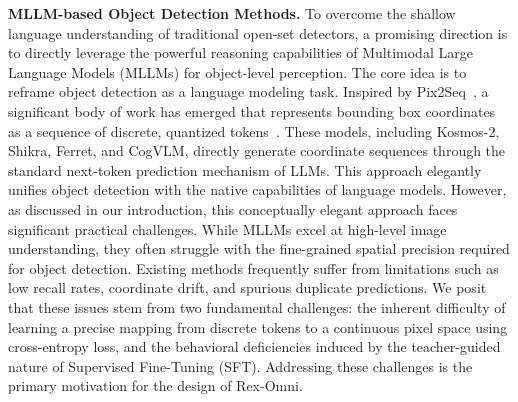 \textbf{MLLM-based Object Detection Methods.}
To overcome the shallow language understanding of traditional open-set detectors, a promising direction is to directly leverage the powerful reasoning capabilities of Multimodal Large Language Models (MLLMs) for object-level perception. The core idea is to reframe object detection as a language modeling task. Inspired by Pix2Seq~\cite{chen2021pix2seq}, a significant body of work has emerged that represents bounding box coordinates as a sequence of discrete, quantized tokens~\cite{peng2023kosmos, chen2023shikra, you2023ferret, wang2023cogvlm, zhan2025griffon}. These models, including Kosmos-2, Shikra, Ferret, and CogVLM, directly generate coordinate sequences through the standard next-token prediction mechanism of LLMs. This approach elegantly unifies object detection with the native capabilities of language models. However, as discussed in our introduction, this conceptually elegant approach faces significant practical challenges. While MLLMs excel at high-level image understanding, they often struggle with the fine-grained spatial precision required for object detection. Existing methods frequently suffer from limitations such as low recall rates, coordinate drift, and spurious duplicate predictions. We posit that these issues stem from two fundamental challenges: the inherent difficulty of learning a precise mapping from discrete tokens to a continuous pixel space using cross-entropy loss, and the behavioral deficiencies induced by the teacher-guided nature of Supervised Fine-Tuning (SFT). Addressing these challenges is the primary motivation for the design of Rex-Omni.
